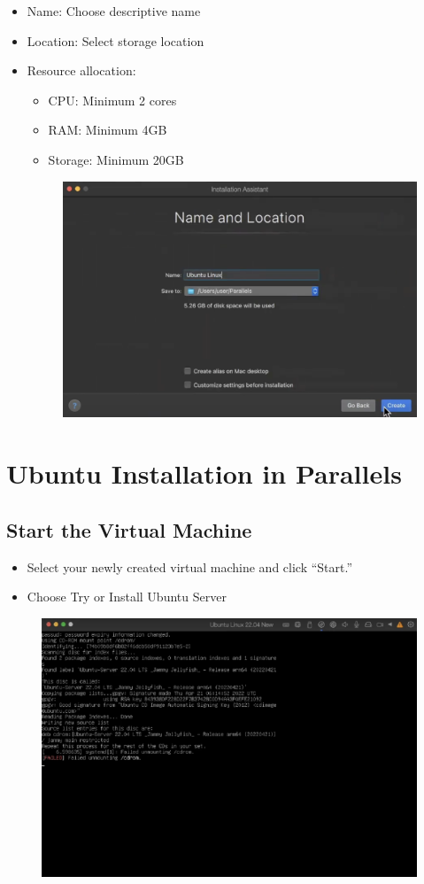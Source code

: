 \documentclass[11pt,a4paper]{article}
\begin{document}
\begin{enumerate}
    \begin{itemize}
        \item Name: Choose descriptive name
        \item Location: Select storage location
        \item Resource allocation:
        \begin{itemize}
            \item CPU: Minimum 2 cores
            \item RAM: Minimum 4GB
            \item Storage: Minimum 20GB
        \end{itemize}
        \begin{figure}[htp]
            \centering
            \includegraphics[width=0.6\linewidth]{images/step13.png}
        \end{figure}
    \end{itemize}
\end{enumerate}

\section{Ubuntu Installation in Parallels}
\subsection{Start the Virtual Machine}
    \begin{itemize}
        \item Select your newly created virtual machine and click ``Start.''
        \item Choose Try or Install Ubuntu Server
    \end{itemize}
        \begin{figure}[htp]
            \centering
            \includegraphics[width=0.6\linewidth]{images/step14.png}
        \end{figure}
\end{document}
